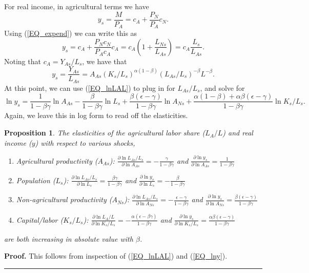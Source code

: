 \documentclass[11pt]{article}
\newtheorem{proposition}{Proposition}
\newenvironment{proof}[1][Proof]{\noindent\textbf{#1.} }{\ \rule{0.5em}{0.5em}}
\begin{document}
For real income, in agricultural terms we have
\begin{equation}
    y_s = \frac{M}{P_A} = c_A + \frac{P_N}{P_A} c_N. \nonumber
\end{equation}
Using (\ref{EQ_expend}) we can write this as
\begin{equation}
    y_s = c_A + \frac{P_N c_N}{P_A c_A}c_A = c_A \left(1 + \frac{L_{Ns}}{L_{As}}\right) = c_A \frac{L_s}{L_{As}}. \nonumber
\end{equation}
Noting that $c_A = Y_{As}/L_s$, we have that
\begin{equation}
    y_s = \frac{Y_{As}}{L_{As}} = A_{As} (K_s/L_s)^{\alpha(1-\beta)} (L_{As}/L_s)^{-\beta} L^{-\beta}. \nonumber
\end{equation}
At this point, we can use (\ref{EQ_lnLAL}) to plug in for $L_{As}/L_s$, and solve for 
\begin{equation}
    \ln y_s = \frac{1}{1-\beta\gamma} \ln A_{As} - \frac{\beta}{1-\beta\gamma} \ln L_s + \frac{\beta(\epsilon-\gamma)}{1-\beta\gamma} \ln A_{Ns} + \frac{\alpha(1-\beta) + \alpha\beta(\epsilon-\gamma)}{1-\beta\gamma} \ln K_s/L_s. \label{EQ_lny}
\end{equation}
Again, we leave this in log form to read off the elasticities.

\begin{proposition}
The elasticities of the agricultural labor share ($L_A/L$) and real income ($y$) with respect to various shocks,
\begin{enumerate}
    \item[(a)] Agricultural productivity ($A_{As}$): $\frac{\partial \ln L_{As}/L_s}{\partial \ln A_{As}} = - \frac{\gamma}{1-\beta\gamma}$ and $\frac{\partial \ln y_s}{\partial \ln A_{As}} = \frac{1}{1-\beta\gamma}$
    \item[(b)] Population ($L_s$): $\frac{\partial \ln L_{As}/L_s}{\partial \ln L_s} = \frac{\beta\gamma}{1-\beta\gamma}$ and $\frac{\partial \ln y_s}{\partial \ln L_s} = - \frac{\beta}{1-\beta\gamma}$
    \item[(c)] Non-agricultural productivity ($A_{Ns}$): $\frac{\partial \ln L_{As}/L_s}{\partial \ln A_{Ns}} = - \frac{\epsilon-\gamma}{1-\beta\gamma}$ and $\frac{\partial \ln y_s}{\partial \ln A_{Ns}} = \frac{\beta(\epsilon-\gamma)}{1-\beta\gamma}$
    \item[(d)] Capital/labor ($K_s/L_s$): $\frac{\partial \ln L_A/L}{\partial \ln K_s/L_s} = -\frac{\alpha(\epsilon-\beta\gamma)}{1-\beta\gamma}$ and $\frac{\partial \ln y_s}{\partial \ln K_s/L_s} = \frac{\alpha\beta(\epsilon-\gamma)}{1-\beta\gamma}$
\end{enumerate}
are both increasing in absolute value with $\beta$.
\end{proposition}
\begin{proof}
This follows from inspection of (\ref{EQ_lnLAL}) and (\ref{EQ_lny}).
\end{proof}
\end{document}

